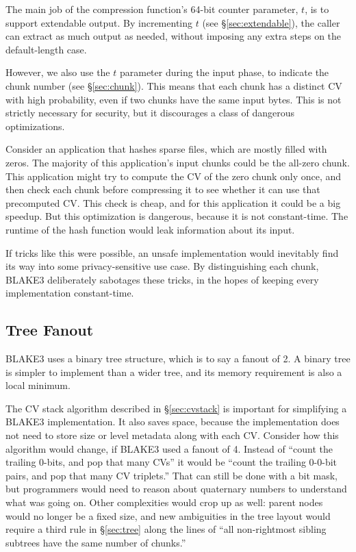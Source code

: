 \documentclass[11pt,notitlepage,a4paper]{article}
\begin{document}
The main job of the compression function's 64-bit counter parameter, $t$, is to
support extendable output. By incrementing $t$ (see \S\ref{sec:extendable}),
the caller can extract as much output as needed, without imposing any extra
steps on the default-length case.

However, we also use the $t$ parameter during the input phase, to indicate the
chunk number (see \S\ref{sec:chunk}). This means that each chunk has a distinct
CV with high probability, even if two chunks have the same input bytes. This is
not strictly necessary for security, but it discourages a class of dangerous
optimizations.

Consider an application that hashes sparse files, which are mostly filled with
zeros. The majority of this application's input chunks could be the all-zero
chunk. This application might try to compute the CV of the zero chunk only
once, and then check each chunk before compressing it to see whether it can use
that precomputed CV. This check is cheap, and for this application it could be
a big speedup. But this optimization is dangerous, because it is not
constant-time. The runtime of the hash function would leak information about
its input.

If tricks like this were possible, an unsafe implementation would inevitably
find its way into some privacy-sensitive use case. By distinguishing each
chunk, BLAKE3 deliberately sabotages these tricks, in the hopes of keeping
every implementation constant-time.

\subsection{Tree Fanout}\label{sec:treefanout}

BLAKE3 uses a binary tree structure, which is to say a fanout of 2. A binary
tree is simpler to implement than a wider tree, and its memory requirement is
also a local minimum.

The CV stack algorithm described in \S\ref{sec:cvstack} is important for
simplifying a BLAKE3 implementation. It also saves space, because the
implementation does not need to store size or level metadata along with each
CV. Consider how this algorithm would change, if BLAKE3 used a fanout of 4.
Instead of ``count the trailing 0-bits, and pop that many CVs'' it would be
``count the trailing 0-0-bit pairs, and pop that many CV triplets.'' That can
still be done with a bit mask, but programmers would need to reason about
quaternary numbers to understand what was going on. Other complexities would
crop up as well: parent nodes would no longer be a fixed size, and new
ambiguities in the tree layout would require a third rule in \S\ref{sec:tree}
along the lines of ``all non-rightmost sibling subtrees have the same number of
chunks.''
\end{document}
